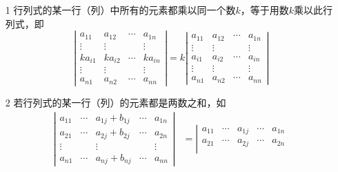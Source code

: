\begin{frame} 

\begin{xingzhi}[线性性质]
  \begin{itemize}
  \item[1] 行列式的某一行（列）中所有的元素都乘以同一个数$k$，等于用数$k$乘以此行列式，即
    \begin{equation}\label{xz3-1}
      \left|
        \begin{array}{ccccc}
          a_{11}  & a_{12} & \cdots & a_{1n} \\
          \vdots & \vdots     &        & \vdots \\
          ka_{i1}  & ka_{i2} & \cdots & ka_{in} \\
          \vdots & \vdots     &        & \vdots \\
          a_{n1}  & a_{n2} & \cdots & a_{nn}
        \end{array}
      \right| = k
      \left|
        \begin{array}{ccccc}
          a_{11}  & a_{12} & \cdots & a_{1n} \\
          \vdots & \vdots     &        & \vdots \\
          a_{i1}  & a_{i2} & \cdots & a_{in} \\
          \vdots & \vdots     &        & \vdots \\
          a_{n1}  & a_{n2} & \cdots & a_{nn}
        \end{array}
      \right|
    \end{equation}
  \item[2] 若行列式的某一行（列）的元素都是两数之和，如       \begin{equation}\label{xz3-2}
      \begin{aligned}
        \left|
        \begin{array}{ccccc}
          a_{11} & \cdots & a_{1j}+b_{1j} & \cdots & a_{1n} \\
          a_{21} & \cdots & a_{2j}+b_{2j} & \cdots & a_{2n} \\
          \vdots&        & \vdots      &        & \vdots \\
          a_{n1} & \cdots & a_{nj}+b_{nj} & \cdots & a_{nn}
        \end{array}
        \right| & =  
        \left|
    \begin{array}{ccccc}
      a_{11} & \cdots & a_{1j} & \cdots & a_{1n} \\
      a_{21} & \cdots & a_{2j} & \cdots & a_{2n} \\

\end{array}
\end{aligned}
\end{equation}
\end{itemize}
\end{xingzhi}
\end{frame}
